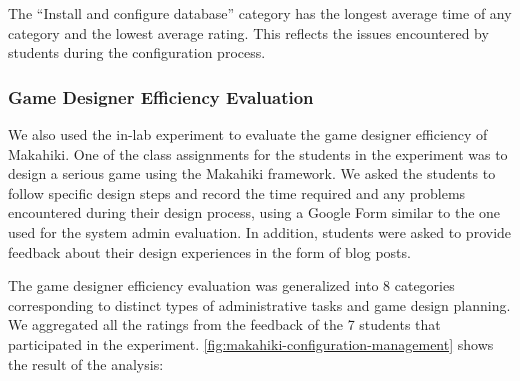 \documentclass{sigchi}
\begin{document}
The ``Install and configure database'' category has the longest average time of any category
and the lowest average rating. This reflects the issues encountered by students during the configuration process.

\subsubsection{Game Designer Efficiency Evaluation}

We also used the in-lab experiment to evaluate the game
designer efficiency of Makahiki. One of the class assignments for the students in the
experiment was to design a serious game using the Makahiki framework. We asked the students
to follow specific design steps and record the time required and any problems encountered during
their design process, using a Google Form similar to the one used for the system admin
evaluation. In addition, students were asked to provide feedback about their
design experiences in the form of blog posts.

The game designer efficiency evaluation was generalized into 8 categories corresponding to 
distinct types of administrative tasks and game design planning. We aggregated all the 
ratings from the feedback of the 7 students that participated in the experiment. 
\autoref{fig:makahiki-configuration-management} shows the result of the analysis:
\end{document}
